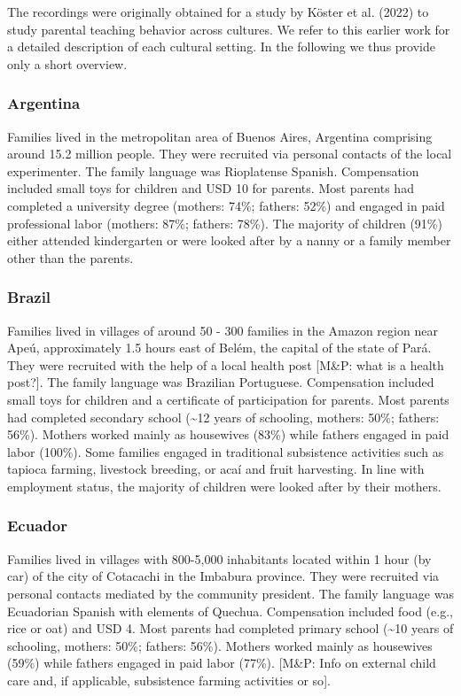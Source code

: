 \documentclass[
  man,floatsintext]{apa6}
\begin{document}
The recordings were originally obtained for a study by Köster et al. (2022) to study parental teaching behavior across cultures. We refer to this earlier work for a detailed description of each cultural setting. In the following we thus provide only a short overview.

\hypertarget{argentina}{%
\subsubsection{Argentina}\label{argentina}}

Families lived in the metropolitan area of Buenos Aires, Argentina comprising around 15.2 million people. They were recruited via personal contacts of the local experimenter. The family language was Rioplatense Spanish. Compensation included small toys for children and USD 10 for parents. Most parents had completed a university degree (mothers: 74\%; fathers: 52\%) and engaged in paid professional labor (mothers: 87\%; fathers: 78\%). The majority of children (91\%) either attended kindergarten or were looked after by a nanny or a family member other than the parents.

\hypertarget{brazil}{%
\subsubsection{Brazil}\label{brazil}}

Families lived in villages of around 50 - 300 families in the Amazon region near Apeú, approximately 1.5 hours east of Belém, the capital of the state of Pará. They were recruited with the help of a local health post {[}M\&P: what is a health post?{]}. The family language was Brazilian Portuguese. Compensation included small toys for children and a certificate of participation for parents. Most parents had completed secondary school (\textasciitilde12 years of schooling, mothers: 50\%; fathers: 56\%). Mothers worked mainly as housewives (83\%) while fathers engaged in paid labor (100\%). Some families engaged in traditional subsistence activities such as tapioca farming, livestock breeding, or acaí and fruit harvesting. In line with employment status, the majority of children were looked after by their mothers.

\hypertarget{ecuador}{%
\subsubsection{Ecuador}\label{ecuador}}

Families lived in villages with 800-5,000 inhabitants located within 1 hour (by car) of the city of Cotacachi in the Imbabura province. They were recruited via personal contacts mediated by the community president. The family language was Ecuadorian Spanish with elements of Quechua. Compensation included food (e.g., rice or oat) and USD 4. Most parents had completed primary school (\textasciitilde10 years of schooling, mothers: 50\%; fathers: 56\%). Mothers worked mainly as housewives (59\%) while fathers engaged in paid labor (77\%). {[}M\&P: Info on external child care and, if applicable, subsistence farming activities or so{]}.
\end{document}
